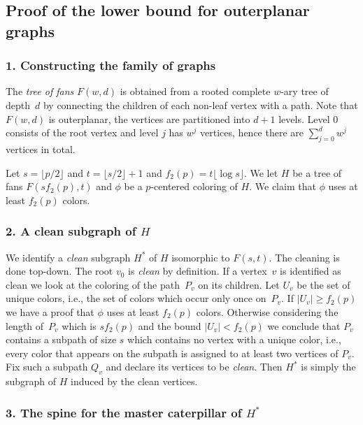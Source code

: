 \subsection{Proof of the lower bound for outerplanar graphs}\hfill

\subsubsection*{1.  Constructing the family of graphs}\hfill

The \emph{tree of fans} $F(w,d)$ is obtained from a rooted complete
$w$-ary tree of depth~$d$ by connecting the children of each non-leaf 
vertex with a path. Note that $F(w,d)$ is outerplanar, the vertices
are partitioned into $d+1$ levels. Level 0 consists of the root vertex and
level $j$ has $w^j$ vertices, hence there are $\sum_{j=0}^d w^j$ vertices in total.

Let $s=\lfloor p/2\rfloor$ and $t = \lfloor s/2 \rfloor +1$ and
$f_2(p) = t\lfloor\log s\rfloor$.  We let $H$ be a tree of fans $F( s f_2(p), t )$ and
$\phi$ be a $p$-centered coloring of $H$. We claim that $\phi$ uses at
least $f_2(p)$ colors.

\subsubsection*{2.  A clean subgraph of $H$}\hfill

We identify a \emph{clean} subgraph $H^*$ of $H$ isomorphic to $F(s,t)$. 
The cleaning is done top-down. The root $v_0$ is
\emph{clean} by definition. If a vertex~$v$ is identified as clean we look at
the coloring of the path~$P_v$ on its children.  Let $U_v$ be the set of
unique colors, i.e., the set of colors which occur only once on~$P_v$.  If
$|U_v| \geq f_2(p)$ we have a proof that $\phi$ uses at least $f_2(p)$
colors. Otherwise considering the length of~$P_v$ which is $s f_2(p)$ and the
bound $|U_v|<f_2(p)$ we conclude that $P_v$ contains a subpath of size $s$
which contains no vertex with a unique color, i.e., every color that appears
on the subpath is assigned to at least two vertices of $P_v$. Fix such a
subpath $Q_v$ and declare its vertices to be \emph{clean}.  Then $H^*$ is
simply the subgraph of $H$ induced by the clean vertices.

\subsubsection*{3.  The spine for the master caterpillar of $H^*$}\hfill

